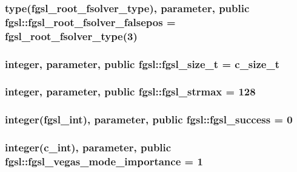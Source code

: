 \hypertarget{classfgsl_ac71356c84267ed5e1dba5501be28b428}{
\subsubsection[{fgsl\-\_\-root\-\_\-fsolver\-\_\-falsepos}]{\setlength{\rightskip}{0pt plus 5cm}type({\bf fgsl\-\_\-root\-\_\-fsolver\-\_\-type}), parameter, public fgsl\-::fgsl\-\_\-root\-\_\-fsolver\-\_\-falsepos = {\bf fgsl\-\_\-root\-\_\-fsolver\-\_\-type}(3)}}\label{classfgsl_ac71356c84267ed5e1dba5501be28b428}
\hypertarget{classfgsl_a82c8fc2281b4c13609c41ae8b7f1cb1e}{
\subsubsection[{fgsl\-\_\-size\-\_\-t}]{\setlength{\rightskip}{0pt plus 5cm}integer, parameter, public fgsl\-::fgsl\-\_\-size\-\_\-t = c\-\_\-size\-\_\-t}}\label{classfgsl_a82c8fc2281b4c13609c41ae8b7f1cb1e}
\hypertarget{classfgsl_a1951faf9d6c8119266db0e5eee1865b7}{
\subsubsection[{fgsl\-\_\-strmax}]{\setlength{\rightskip}{0pt plus 5cm}integer, parameter, public fgsl\-::fgsl\-\_\-strmax = 128}}\label{classfgsl_a1951faf9d6c8119266db0e5eee1865b7}
\hypertarget{classfgsl_a5637d95a4aceec9a80a9b74a2e40ebdf}{
\subsubsection[{fgsl\-\_\-success}]{\setlength{\rightskip}{0pt plus 5cm}integer({\bf fgsl\-\_\-int}), parameter, public fgsl\-::fgsl\-\_\-success = 0}}\label{classfgsl_a5637d95a4aceec9a80a9b74a2e40ebdf}
\hypertarget{classfgsl_a40718f473b729ccccca99b83b15569f1}{
\subsubsection[{fgsl\-\_\-vegas\-\_\-mode\-\_\-importance}]{\setlength{\rightskip}{0pt plus 5cm}integer(c\-\_\-int), parameter, public fgsl\-::fgsl\-\_\-vegas\-\_\-mode\-\_\-importance = 1}}\label{classfgsl_a40718f473b729ccccca99b83b15569f1}
